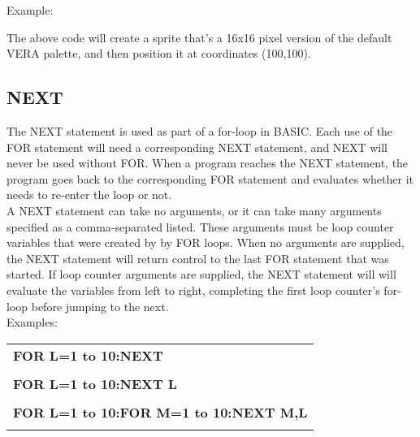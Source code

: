 Example:\\


The above code will create a sprite that's a 16x16 pixel version of the default
VERA palette, and then position it at coordinates (100,100).\\

\subsection{NEXT}

The {\ttfamily NEXT} statement is used as part of a for-loop in BASIC.  Each
use of the {\ttfamily FOR} statement will need a corresponding {\ttfamily NEXT}
statement, and {\ttfamily NEXT} will never be used without {\ttfamily FOR}.
When a program reaches the {\ttfamily NEXT} statement, the program goes back to
the corresponding {\ttfamily FOR} statement and evaluates whether it needs to
re-enter the loop or not.\\

A {\ttfamily NEXT} statement can take no arguments, or it can take many
arguments specified as a comma-separated listed.  These arguments must be loop
counter variables that were created by by {\ttfamily FOR} loops.   When no
arguments are supplied, the {\ttfamily NEXT} statement will return control to
the last {\ttfamily FOR} statement that was started.  If loop counter arguments
are supplied, the {\ttfamily NEXT} statement will will evaluate the variables
from left to right, completing the first loop counter's for-loop before jumping
to the next.\\

 Examples:\\

\begin{tabular}{l}

	{\ttfamily\bfseries FOR L=1 to 10:NEXT}\\\\

	{\ttfamily\bfseries FOR L=1 to 10:NEXT L}\\\\

	{\ttfamily\bfseries FOR L=1 to 10:FOR M=1 to 10:NEXT M,L}\\\\

\end{tabular}


